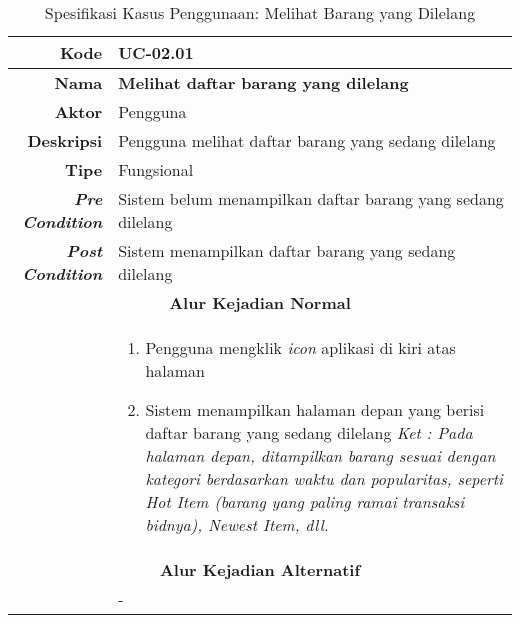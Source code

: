 
\begin{table}[H]
	\centering
	\caption{Spesifikasi Kasus Penggunaan: Melihat Barang yang Dilelang}
	\label{uc02.01}
	\begin{tabular}{|r|p{8cm}|}
		\hline
		\textbf{Kode}                                                    & UC-02.01                                                     \\ \hline
		\textbf{Nama}                                                    
			& \textbf{Melihat daftar barang yang dilelang}                                         
			\\ \hline
		\textbf{Aktor}                                                   & Pengguna                                                    \\ \hline
		\textbf{Deskripsi}
			& Pengguna melihat daftar barang yang sedang dilelang
			\\ \hline
		\textbf{Tipe}                                                    
			& Fungsional
			\\ \hline
		\textbf{\textit{Pre Condition}}
			& Sistem belum menampilkan daftar barang yang sedang dilelang
			\\ \hline
		\textbf{\textit{Post Condition}}
			& Sistem menampilkan daftar barang yang sedang dilelang
			\\ \hline
		\multicolumn{2}{|c|}{\textbf{Alur Kejadian Normal}}                                                                            \\ \hline
		\multicolumn{1}{|l|}{}                                           & 
		\begin{enumerate}
			\item Pengguna mengklik \textit{icon} aplikasi di kiri atas halaman
			\item Sistem menampilkan halaman depan yang berisi daftar barang yang sedang dilelang
				  \newline
				  \textit{Ket : Pada halaman depan, ditampilkan barang sesuai dengan kategori berdasarkan waktu dan popularitas, seperti \textit{Hot Item} (barang yang paling ramai transaksi bidnya), Newest Item, dll.}
		\end{enumerate}
		\\ \hline
		\multicolumn{2}{|c|}{\textbf{Alur Kejadian Alternatif}}                                                         \\ \hline
		\multicolumn{1}{|l|}{}                                           
			& -
		\\ \hline
	\end{tabular}
\end{table}